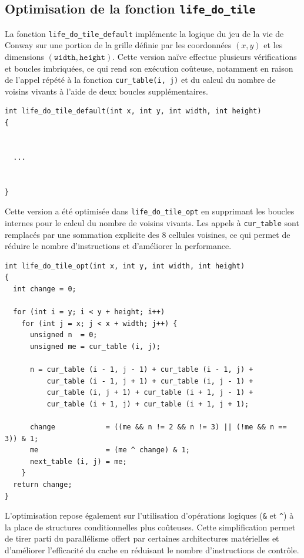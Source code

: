 \documentclass[a4paper,12pt]{article}
\begin{document}
\subsection{Optimisation de la fonction \texttt{life\_do\_tile}}
\vspace{5mm}
La fonction \texttt{life\_do\_tile\_default} implémente la logique du jeu de la vie de Conway sur une portion de la grille définie par les coordonnées $(x, y)$ et les dimensions $(\texttt{width}, \texttt{height})$. Cette version naïve effectue plusieurs vérifications et boucles imbriquées, ce qui rend son exécution coûteuse, notamment en raison de l'appel répété à la fonction \texttt{cur\_table(i, j)} et du calcul du nombre de voisins vivants à l'aide de deux boucles supplémentaires.
\vspace{5mm}
\begin{lstlisting}[style=cstyle, caption=Version initiale non optimisée]
int life_do_tile_default(int x, int y, int width, int height)
{


  ...


}
\end{lstlisting}
\vspace{5mm}
Cette version a été optimisée dans \texttt{life\_do\_tile\_opt} en supprimant les boucles internes pour le calcul du nombre de voisins vivants. Les appels à \texttt{cur\_table} sont remplacés par une sommation explicite des 8 cellules voisines, ce qui permet de réduire le nombre d'instructions et d'améliorer la performance.
\vspace{5mm}
\begin{lstlisting}[style=cstyle, caption=Version optimisée]
int life_do_tile_opt(int x, int y, int width, int height)
{
  int change = 0;

  for (int i = y; i < y + height; i++)
    for (int j = x; j < x + width; j++) {
      unsigned n  = 0;
      unsigned me = cur_table (i, j);

      n = cur_table (i - 1, j - 1) + cur_table (i - 1, j) +
          cur_table (i - 1, j + 1) + cur_table (i, j - 1) +
          cur_table (i, j + 1) + cur_table (i + 1, j - 1) +
          cur_table (i + 1, j) + cur_table (i + 1, j + 1);

      change            = ((me && n != 2 && n != 3) || (!me && n == 3)) & 1;
      me                = (me ^ change) & 1;
      next_table (i, j) = me;
    }
  return change;
}
\end{lstlisting}

L'optimisation repose également sur l'utilisation d'opérations logiques (\texttt{\&} et \texttt{\^{}}) à la place de structures conditionnelles plus coûteuses. Cette simplification permet de tirer parti du parallélisme offert par certaines architectures matérielles et d'améliorer l'efficacité du cache en réduisant le nombre d'instructions de contrôle.
\end{document}
